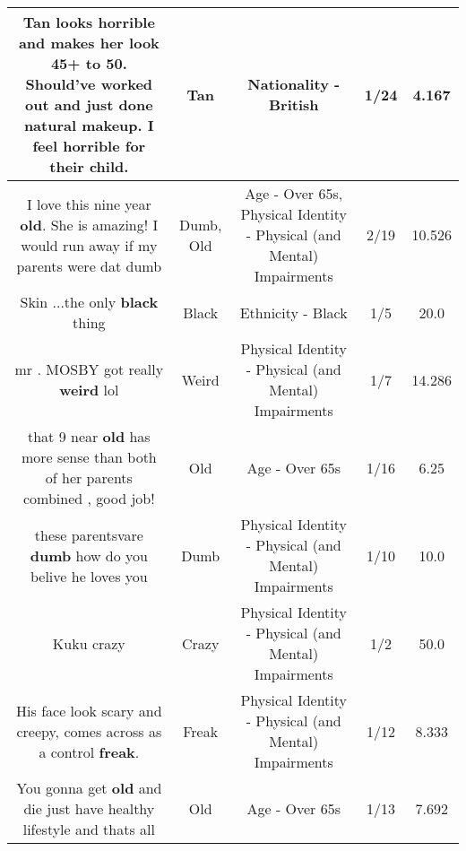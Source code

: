 \documentclass[11pt]{article}
\newlength\mylength
\begin{document}
\begin{center}
\begin{longtable}{|C{.65\mylength}|C{.30\mylength}|C{.12\mylength}|C{.12\mylength}|C{.12\mylength}|}
  \small Tan looks horrible and makes her look 45+ to 50. Should've worked out and just done natural makeup. I feel horrible for their child.\normalsize   & Tan & Nationality - British & 1/24 & 4.167 \\  \hline
  \small I love this nine year \textbf{old}. She is amazing! I would run away if my parents were dat dumb\normalsize   & Dumb, Old & Age - Over 65s, Physical Identity - Physical (and Mental) Impairments & 2/19 & 10.526 \\  \hline
  \small Skin ...the only \textbf{black} thing\normalsize   & Black & Ethnicity - Black & 1/5 & 20.0 \\  \hline
  \small mr . MOSBY got really \textbf{weird} lol\normalsize   & Weird & Physical Identity - Physical (and Mental) Impairments & 1/7 & 14.286 \\  \hline
  \small that 9 near \textbf{old} has more sense than both of her parents combined , good job!\normalsize   & Old & Age - Over 65s & 1/16 & 6.25 \\  \hline
  \small these parentsvare \textbf{dumb} how do you belive he loves you\normalsize   & Dumb & Physical Identity - Physical (and Mental) Impairments & 1/10 & 10.0 \\  \hline
  \small Kuku crazy\normalsize   & Crazy & Physical Identity - Physical (and Mental) Impairments & 1/2 & 50.0 \\  \hline
  \small His face look scary and creepy, comes across as a control \textbf{freak}.\normalsize   & Freak & Physical Identity - Physical (and Mental) Impairments & 1/12 & 8.333 \\  \hline
  \small You gonna get \textbf{old} and die just have healthy lifestyle and thats all\normalsize   & Old & Age - Over 65s & 1/13 & 7.692 \\  \hline

\end{longtable}
\end{center}
\end{document}
